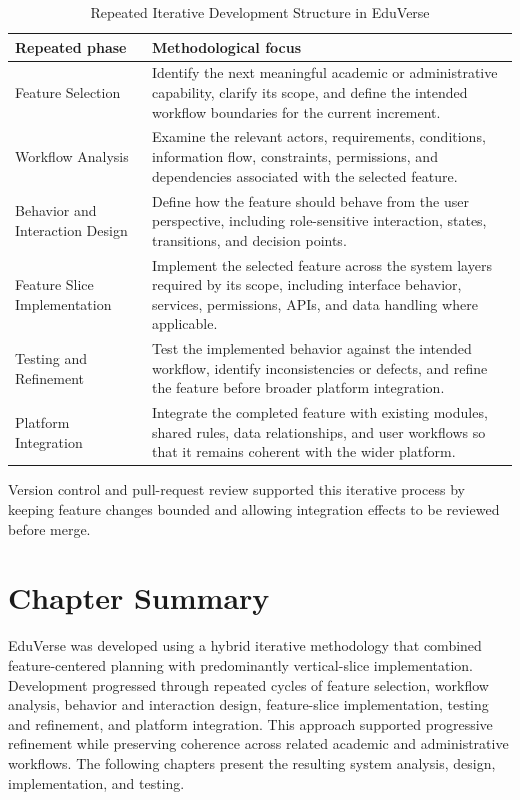 \begin{table}[htbp]
  \centering
  \small
  \renewcommand{\arraystretch}{1.15}
  \setlength{\tabcolsep}{5pt}
  \caption{Repeated Iterative Development Structure in EduVerse}
  \label{tab:eduverse_iterative_development_structure}
  \begin{tabular}{|>{\raggedright\arraybackslash}p{}|>{\raggedright\arraybackslash}p{}|}
    \hline
    \textbf{Repeated phase} & \textbf{Methodological focus} \\
    \hline
    Feature Selection & Identify the next meaningful academic or administrative capability, clarify its scope, and define the intended workflow boundaries for the current increment. \\
    \hline
    Workflow Analysis & Examine the relevant actors, requirements, conditions, information flow, constraints, permissions, and dependencies associated with the selected feature. \\
    \hline
    Behavior and Interaction Design & Define how the feature should behave from the user perspective, including role-sensitive interaction, states, transitions, and decision points. \\
    \hline
    Feature Slice Implementation & Implement the selected feature across the system layers required by its scope, including interface behavior, services, permissions, APIs, and data handling where applicable. \\
    \hline
    Testing and Refinement & Test the implemented behavior against the intended workflow, identify inconsistencies or defects, and refine the feature before broader platform integration. \\
    \hline
    Platform Integration & Integrate the completed feature with existing modules, shared rules, data relationships, and user workflows so that it remains coherent with the wider platform. \\
    \hline
  \end{tabular}
\end{table}

Version control and pull-request review supported this iterative process by
keeping feature changes bounded and allowing integration effects to be reviewed
before merge.

\section{Chapter Summary}\label{sec:chapter3_summary}

EduVerse was developed using a hybrid iterative methodology that combined
feature-centered planning with predominantly vertical-slice implementation.
Development progressed through repeated cycles of feature selection, workflow
analysis, behavior and interaction design, feature-slice implementation,
testing and refinement, and platform integration. This approach supported
progressive refinement while preserving coherence across related academic and
administrative workflows. The following chapters present the resulting system
analysis, design, implementation, and testing.
